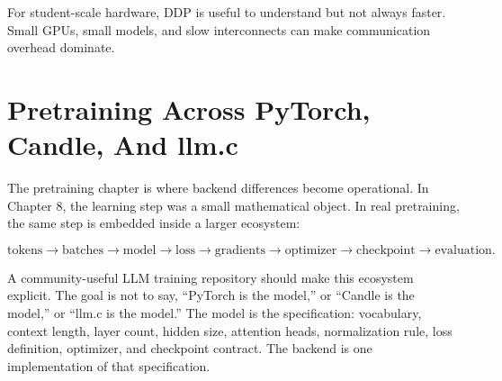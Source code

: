 For student-scale hardware, DDP is useful to understand but not always faster. Small GPUs, small models, and slow interconnects can make communication overhead dominate.

\section{Pretraining Across PyTorch, Candle, And llm.c}

The pretraining chapter is where backend differences become operational. In Chapter 8,
the learning step was a small mathematical object. In real pretraining, the same step is
embedded inside a larger ecosystem:

\[
\text{tokens} \rightarrow \text{batches} \rightarrow \text{model}
\rightarrow \text{loss} \rightarrow \text{gradients}
\rightarrow \text{optimizer} \rightarrow \text{checkpoint}
\rightarrow \text{evaluation}.
\]

A community-useful LLM training repository should make this ecosystem explicit. The goal
is not to say, ``PyTorch is the model,'' or ``Candle is the model,'' or ``llm.c is the
model.'' The model is the specification: vocabulary, context length, layer count, hidden
size, attention heads, normalization rule, loss definition, optimizer, and checkpoint
contract. The backend is one implementation of that specification.

